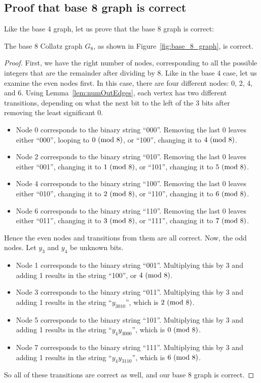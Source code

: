 \subsection{Proof that base 8 graph is correct} \label{subsubsec:base8proof}
Like the base 4 graph, let us prove that the base 8 graph is correct:
\begin{theorem}
The base $8$ Collatz graph $G_8$, as shown in Figure~\ref{fig:base_8_graph}, is correct.
\end{theorem}
\begin{proof}
First, we have the right number of nodes, corresponding to all the possible integers that are the remainder after dividing by 8. Like in the base 4 case, let us examine the even nodes first. In this case, there are four different nodes: 0, 2, 4, and 6. Using Lemma~\ref{lem:numOutEdges}, each vertex has two different transitions, depending on what the next bit to the left of the 3 bits after removing the least significant 0. 
\begin{itemize}
    \item Node 0 corresponds to the binary string ``000''. Removing the last 0 leaves either ``000'', looping to $0\ (\mathrm{mod}\ 8)$, or ``100'', changing it to $4\ (\mathrm{mod}\ 8)$.
    \item Node 2 corresponds to the binary string ``010''. Removing the last 0 leaves either ``001'', changing it to $1\ (\mathrm{mod}\ 8)$, or ``101'', changing it to $5\ (\mathrm{mod}\ 8)$.
    \item Node 4 corresponds to the binary string ``100''. Removing the last 0 leaves either ``010'', changing it to $2\ (\mathrm{mod}\ 8)$, or ``110'', changing it to $6\ (\mathrm{mod}\ 8)$.
    \item Node 6 corresponds to the binary string ``110''. Removing the last 0 leaves either ``011'', changing it to $3\ (\mathrm{mod}\ 8)$, or ``111'', changing it to $7\ (\mathrm{mod}\ 8)$.
\end{itemize}
Hence the even nodes and transitions from them are all correct. Now, the odd nodes. Let $y_3$ and $y_4$ be unknown bits.
\begin{itemize}
    \item Node 1 corresponds to the binary string ``001''. Multiplying this by 3 and adding 1 results in the string ``100'', or $4\ (\mathrm{mod}\ 8)$.
    \item Node 3 corresponds to the binary string ``011''. Multiplying this by 3 and adding 1 results in the string ``$y_3010$'', which is $2\ (\mathrm{mod}\ 8)$.
    \item Node 5 corresponds to the binary string ``101''. Multiplying this by 3 and adding 1 results in the string ``$y_4y_3000$'', which is $0\ (\mathrm{mod}\ 8)$.
    \item Node 7 corresponds to the binary string ``111''. Multiplying this by 3 and adding 1 results in the string ``$y_4y_3110$'', which is $6\ (\mathrm{mod}\ 8)$.
\end{itemize}
So all of these transitions are correct as well, and our base 8 graph is correct.
\end{proof}
